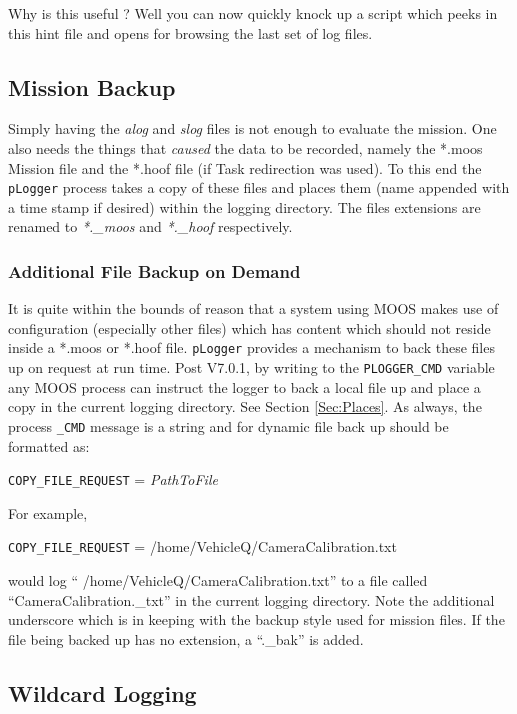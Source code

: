 \documentclass[a4paper,10pt]{article}
\newcommand{\Code}[1]{\texttt{#1} }
\newcommand{\code}[1]{\Code{#1} }
\begin{document}
Why is this useful ? Well you can now quickly knock up a script which peeks in this hint file and opens for browsing the last set of log files.




\subsection{Mission Backup}
Simply having the {\it{alog}} and {\it{slog}} files is not enough
to evaluate the mission. One also needs the things that
{\em{caused}} the data to be recorded, namely the *.moos Mission
file and the *.hoof file (if Task redirection was used). To this
end the \code{pLogger} process takes a copy of these files and
places them (name appended with a time stamp if desired) within
the logging directory. The files extensions are renamed to
{\it{*.\_moos}} and {\it{*.\_hoof}} respectively.

\subsubsection{Additional File Backup on Demand}
It is quite within the bounds of reason that a system using MOOS makes use of
configuration (especially other files) which has content which should not reside inside a *.moos or *.hoof file.
\code{pLogger} provides a mechanism to back these files up on request at run time. Post V7.0.1, by writing to the \code{PLOGGER\_CMD}
variable any MOOS process can instruct the logger to back a local file up and place a copy in the current logging directory. See Section \ref{Sec:Places}. As always, the process \code{\_CMD} message is a string and for dynamic file back up should be formatted as:

\begin{center}
\code{COPY\_FILE\_REQUEST} =  \textit{PathToFile}
\end{center}

For example,

\begin{center}
\code{COPY\_FILE\_REQUEST} =  /home/VehicleQ/CameraCalibration.txt
\end{center}

would log `` /home/VehicleQ/CameraCalibration.txt'' to a file called ``CameraCalibration.\_txt'' in the current logging directory. Note the additional underscore which is in keeping with the backup style used for mission files. If the file being backed up has no extension, a ``.\_bak'' is added.

\subsection{Wildcard Logging}
\end{document}
